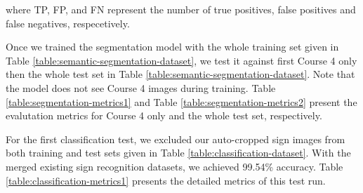 where TP, FP, and FN represent the number of true positives, false positives
and false negatives, respecetively.

Once we trained the segmentation model with the whole training set given in
Table \ref{table:semantic-segmentation-dataset}, we test it against first
Course 4 only then the whole test set in Table
\ref{table:semantic-segmentation-dataset}. Note that the model does not see
Course 4 images during training. Table \ref{table:segmentation-metrics1} and
Table \ref{table:segmentation-metrics2} present the evalutation metrics for
Course 4 only and the whole test set, respectively.

\begin{table}[h]
\caption{Semantic segmentation evalutation metrics for the Course 4 test only.}
\label{table:segmentation-metrics1}
\end{table}

\begin{table}[h]
\caption{Semantic segmentation evalutation metrics for the whole test set.}
\label{table:segmentation-metrics2}
\end{table}

For the first classification test, we excluded our auto-cropped sign images
from both training and test sets given in Table
\ref{table:classification-dataset}.  With the merged existing sign recognition
datasets, we achieved 99.54\% accuracy.  Table
\ref{table:classification-metrics1} presents the detailed metrics of this test
run.


